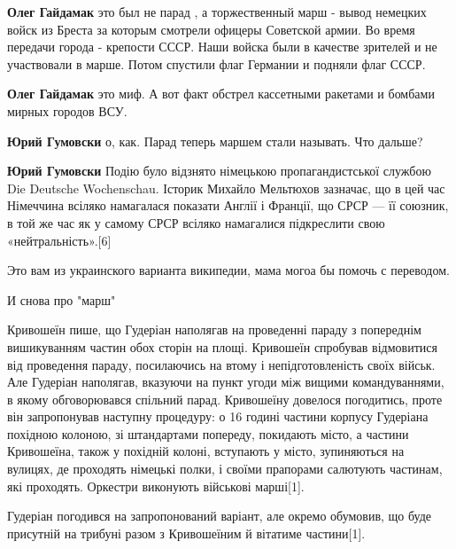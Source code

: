 \begin{itemize}
\begin{itemize}
\textbf{Олег Гайдамак} это был не парад , а торжественный марш - вывод немецких войск из Бреста за которым смотрели офицеры Советской армии. Во время передачи города - крепости СССР. Наши войска были в качестве зрителей и не участвовали в марше. Потом спустили флаг Германии и подняли флаг СССР.


\textbf{Олег Гайдамак} это миф. А вот факт обстрел кассетными ракетами и бомбами мирных городов ВСУ.


\textbf{Юрий Гумовски} о, как. Парад теперь маршем стали называть. Что дальше?



\textbf{Юрий Гумовски} Подію було відзнято німецькою пропагандистської службою Die
Deutsche Wochenschau. Історик Михайло Мельтюхов зазначає, що в цей час
Німеччина всіляко намагалася показати Англії і Франції, що СРСР — її союзник, в
той же час як у самому СРСР всіляко намагалися підкреслити свою
«нейтральність».[6]

Это вам из украинского варианта википедии, мама могоа бы помочь с переводом.




И снова про "марш"

Кривошеїн пише, що Гудеріан наполягав на проведенні параду з попереднім
вишикуванням частин обох сторін на площі. Кривошеїн спробував відмовитися від
проведення параду, посилаючись на втому і непідготовленість своїх військ. Але
Гудеріан наполягав, вказуючи на пункт угоди між вищими командуваннями, в якому
обговорювався спільний парад. Кривошеїну довелося погодитись, проте він
запропонував наступну процедуру: о 16 годині частини корпусу Гудеріана похідною
колоною, зі штандартами попереду, покидають місто, а частини Кривошеїна, також
у похідній колоні, вступають у місто, зупиняються на вулицях, де проходять
німецькі полки, і своїми прапорами салютують частинам, які проходять. Оркестри
виконують військові марші[1].

Гудеріан погодився на запропонований варіант, але окремо обумовив, що буде
присутній на трибуні разом з Кривошеїним й вітатиме частини[1].


\end{itemize}
\end{itemize}
